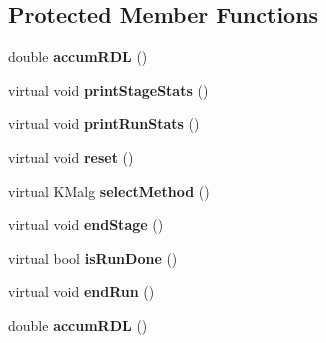 \subsection*{Protected Member Functions}
\begin{DoxyCompactItemize}
\item 
\hypertarget{class_k_mlocal_lloyds_a435060d1c182b915b38a0f7b12ce85e6}{
double {\bfseries accumRDL} ()}
\label{class_k_mlocal_lloyds_a435060d1c182b915b38a0f7b12ce85e6}

\item 
\hypertarget{class_k_mlocal_lloyds_a1f814731cc3c15a197c8ba9071c7fb7a}{
virtual void {\bfseries printStageStats} ()}
\label{class_k_mlocal_lloyds_a1f814731cc3c15a197c8ba9071c7fb7a}

\item 
\hypertarget{class_k_mlocal_lloyds_a9505a5cf770b6bb630b54155d4a80069}{
virtual void {\bfseries printRunStats} ()}
\label{class_k_mlocal_lloyds_a9505a5cf770b6bb630b54155d4a80069}

\item 
\hypertarget{class_k_mlocal_lloyds_a1632443f11db8230f24d9f0fd260bfe3}{
virtual void {\bfseries reset} ()}
\label{class_k_mlocal_lloyds_a1632443f11db8230f24d9f0fd260bfe3}

\item 
\hypertarget{class_k_mlocal_lloyds_a990427f7b10dc1b5dbcf71e775caa958}{
virtual KMalg {\bfseries selectMethod} ()}
\label{class_k_mlocal_lloyds_a990427f7b10dc1b5dbcf71e775caa958}

\item 
\hypertarget{class_k_mlocal_lloyds_afc989e8c7bf9ed9a1bf439701f15aaab}{
virtual void {\bfseries endStage} ()}
\label{class_k_mlocal_lloyds_afc989e8c7bf9ed9a1bf439701f15aaab}

\item 
\hypertarget{class_k_mlocal_lloyds_a3e78b5eefa4c37fa7da109230197de67}{
virtual bool {\bfseries isRunDone} ()}
\label{class_k_mlocal_lloyds_a3e78b5eefa4c37fa7da109230197de67}

\item 
\hypertarget{class_k_mlocal_lloyds_a6bf5a283a6530596ebec1081f082588d}{
virtual void {\bfseries endRun} ()}
\label{class_k_mlocal_lloyds_a6bf5a283a6530596ebec1081f082588d}

\item 
\hypertarget{class_k_mlocal_lloyds_a435060d1c182b915b38a0f7b12ce85e6}{
double {\bfseries accumRDL} ()}
\label{class_k_mlocal_lloyds_a435060d1c182b915b38a0f7b12ce85e6}


\end{DoxyCompactItemize}

